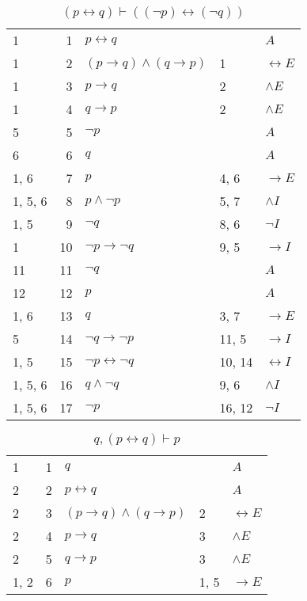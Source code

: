 \documentclass{article}
\begin{document}
\begin{table}[htbp]\caption*{$(p↔q) ⊢ ((¬p)↔(¬q))$}\centering\begin{tabular}{lrlll}
		{1} & 1 & $p↔q$ & {} & $A$ \\
		{1} & 2 & $(p→q)∧(q→p)$ & {1} & $↔E$ \\
		{1} & 3 & $p→q$ & {2} & $∧E$ \\
		{1} & 4 & $q→p$ & {2} & $∧E$ \\
		{5} & 5 & $¬p$ & {} & $A$ \\
		{6} & 6 & $q$ & {} & $A$ \\
		{1, 6} & 7 & $p$ & {4, 6} & $→E$ \\
		{1, 5, 6} & 8 & $p∧ ¬p$ & {5, 7} & $∧I$ \\
		{1, 5} & 9 & $¬q$ & {8, 6} & $¬I$ \\
		{1} & 10 & $¬p→ ¬q$ & {9, 5} & $→I$ \\
		{11} & 11 & $¬q$ & {} & $A$ \\
		{12} & 12 & $p$ & {} & $A$ \\
		{1, 6} & 13 & $q$ & {3, 7} & $→E$ \\
		{5} & 14 & $¬q→ ¬p$ & {11, 5} & $→I$ \\
		{1, 5} & 15 & $¬p↔ ¬q$ & {10, 14} & $↔I$ \\
		{1, 5, 6} & 16 & $q∧ ¬q$ & {9, 6} & $∧I$ \\
		{1, 5, 6} & 17 & $¬p$ & {16, 12} & $¬I$ \\
	\end{tabular}
\end{table}
\begin{table}[htbp]\caption*{$q,(p↔q) ⊢ p$}\centering\begin{tabular}{lrlll}
		{1} & 1 & $q$ & {} & $A$ \\
		{2} & 2 & $p↔q$ & {} & $A$ \\
		{2} & 3 & $(p→q)∧(q→p)$ & {2} & $↔E$ \\
		{2} & 4 & $p→q$ & {3} & $∧E$ \\
		{2} & 5 & $q→p$ & {3} & $∧E$ \\
		{1, 2} & 6 & $p$ & {1, 5} & $→E$ \\
	\end{tabular}
\end{table}
\end{document}
